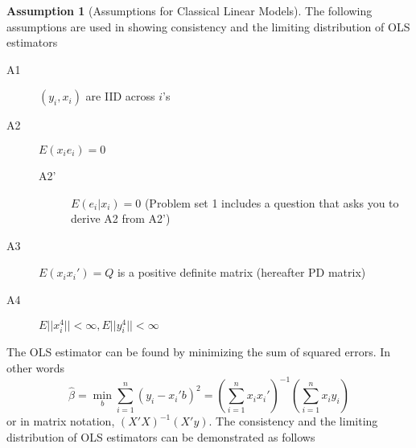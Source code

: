 \documentclass[12pt]{article}
\theoremstyle{definition}
\theoremstyle{property}
\theoremstyle{assumption}
\newtheorem{assumption}{Assumption}[section]
\theoremstyle{example}
\theoremstyle{comment}
\begin{document}
\begin{mdframed}[backgroundcolor=blue!5] 
\begin{assumption}[Assumptions for Classical Linear Models]
\item The following assumptions are used in showing consistency and the limiting distribution of OLS estimators
\begin{description}
\item[A1] $(y_i, x_i)$ are IID across $i$'s
\item[A2] $E(x_ie_i)=0$
\begin{description}
\item[A2'] $E(e_i|x_i)=0$ (Problem set 1 includes a question that asks you to derive A2 from A2')
\end{description}
\item[A3] $E(x_ix_i')=Q$ is a positive definite matrix (hereafter PD matrix)
\item[A4] $E||x_i^4||<\infty, E||y_i^4||<\infty$
\end{description}
\end{assumption}
\end{mdframed} \par
The OLS estimator can be found by minimizing the sum of squared errors. In other words
\[
\hat{\beta}=\min_b\sum_{i=1}^n (y_i-x_i'b)^2 = \left(\sum_{i=1}^nx_ix_i'\right)^{-1}\left(\sum_{i=1}^nx_iy_i\right)
\]
or in matrix notation, $(X'X)^{-1}(X'y)$. The consistency and the limiting distribution of OLS estimators can be demonstrated as follows
\end{document}
